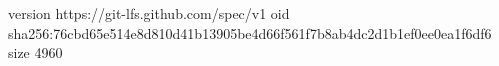 version https://git-lfs.github.com/spec/v1
oid sha256:76cbd65e514e8d810d41b13905be4d66f561f7b8ab4dc2d1b1ef0ee0ea1f6df6
size 4960
